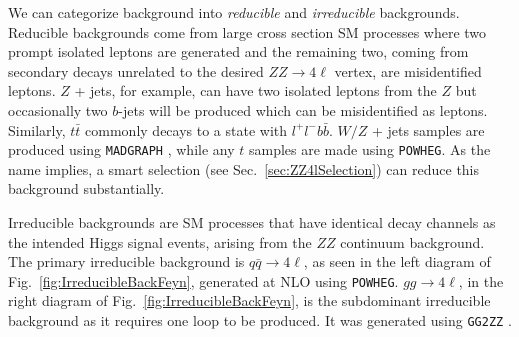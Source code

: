 We can categorize background into \textit{reducible} and \textit{irreducible} backgrounds. Reducible backgrounds come from large cross section SM processes where two prompt isolated leptons are generated and the remaining two, coming from secondary decays unrelated to the desired $ZZ\rightarrow 4\ell$ vertex, are misidentified leptons. $Z$ + jets, for example, can have two isolated leptons from the $Z$ but occasionally two $b$-jets will be produced which can be misidentified as leptons. Similarly, $t\bar{t}$ commonly decays to a state with $l^+l^-b\bar{b}$. $W/Z$ + jets samples are produced using {\tt MADGRAPH} \cite{Alwall:2007st}, while any $t$ samples are made using {\tt POWHEG}. As the name implies, a smart selection (see Sec.~\ref{sec:ZZ4lSelection}) can reduce this background substantially.

Irreducible backgrounds are SM processes that have identical decay channels as the intended Higgs signal events, arising from the $ZZ$ continuum background. The primary irreducible background is $q\bar{q}\rightarrow 4\ell$, as seen in the left diagram of Fig.~\ref{fig:IrreducibleBackFeyn}, generated at NLO using {\tt POWHEG}. $gg \rightarrow 4\ell$, in the right diagram of Fig.~\ref{fig:IrreducibleBackFeyn}, is the subdominant irreducible background as it requires one loop to be produced. It was generated using {\tt GG2ZZ} \cite{Binoth:2008pr}.

